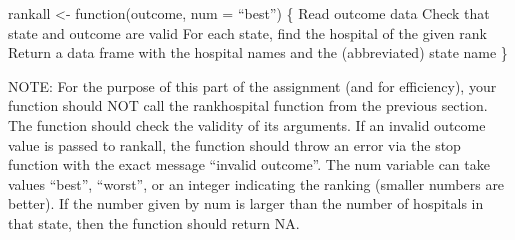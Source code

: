 \documentclass[
]{article}
\begin{document}
rankall \textless- function(outcome, num = ``best'') \{ Read outcome
data Check that state and outcome are valid For each state, find the
hospital of the given rank Return a data frame with the hospital names
and the (abbreviated) state name \}

NOTE: For the purpose of this part of the assignment (and for
efficiency), your function should NOT call the rankhospital function
from the previous section. The function should check the validity of its
arguments. If an invalid outcome value is passed to rankall, the
function should throw an error via the stop function with the exact
message ``invalid outcome''. The num variable can take values ``best'',
``worst'', or an integer indicating the ranking (smaller numbers are
better). If the number given by num is larger than the number of
hospitals in that state, then the function should return NA.
\end{document}
